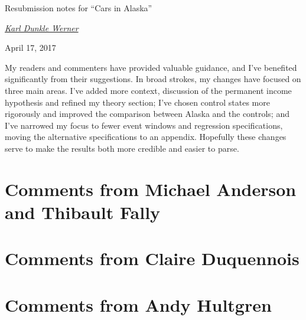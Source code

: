 \documentclass[11pt,letterpaper,oneside]{article}
\begin{document}
\setcounter{page}{0}
\thispagestyle{empty}

\vspace*{0.7in plus 0.3in minus 0.3in}

\begin{center}
    {\huge Resubmission notes for ``Cars in Alaska''}

    \vspace{2em}
    \href{mailto:karldw@berkeley.edu}{\textit{\Large Karl Dunkle Werner}}

    \vspace{1em}
    {\large April 17, 2017}
\end{center}

\vspace{3em plus 1em minus 1em}
\noindent 
My readers and commenters have provided valuable guidance, and I've benefited significantly from their suggestions.
In broad strokes, my changes have focused on three main areas.
I've added more context, discussion of the permanent income hypothesis and refined my theory section;
I've chosen control states more rigorously and improved the comparison between Alaska and the controls; and
I've narrowed my focus to fewer event windows and regression specifications, moving the alternative specifications to an appendix.
Hopefully these changes serve to make the results both more credible and easier to parse.


\pagebreak

\section{Comments from Michael Anderson and Thibault Fally}
\section{Comments from Claire Duquennois}
\section{Comments from Andy Hultgren}
\end{document}
